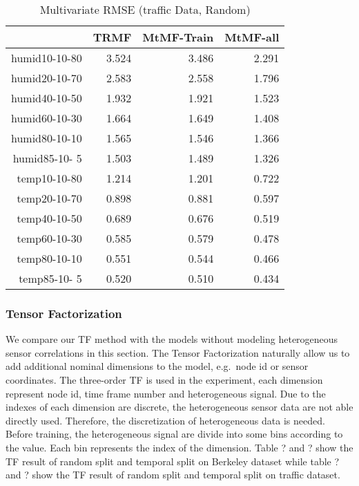 \begin{table}[htbp]
\caption{Multivariate RMSE (traffic Data, Random)}
\label{traffic}
\begin{tabular}{r | r r r}
	&TRMF	&MtMF-Train	&MtMF-all \\ \hline
humid10-10-80	&3.524 	&3.486 	&2.291\\  
humid20-10-70	&2.583 	&2.558 	&1.796\\
humid40-10-50	&1.932 	&1.921 	&1.523\\
humid60-10-30	&1.664 	&1.649 	&1.408\\
humid80-10-10	&1.565 	&1.546 	&1.366\\
humid85-10- 5	&1.503 	&1.489 	&1.326\\
 temp10-10-80	&1.214 	&1.201 	&0.722\\
 temp20-10-70	&0.898 	&0.881 	&0.597\\
 temp40-10-50	&0.689 	&0.676 	&0.519\\
 temp60-10-30	&0.585 	&0.579 	&0.478\\
 temp80-10-10	&0.551 	&0.544 	&0.466\\
 temp85-10- 5	&0.520 	&0.510 	&0.434\\
\end{tabular}
\end{table}

\subsubsection{Tensor Factorization} %
We compare our TF method with the models without modeling heterogeneous sensor correlations in this section.
The Tensor Factorization naturally allow us to add additional nominal dimensions to the model, e.g.\ node id or sensor coordinates.
The three-order TF is used in the experiment, each dimension represent node id, time frame number and heterogeneous signal.  
Due to the indexes of each dimension are discrete, the heterogeneous sensor data are not able directly used.
Therefore, the discretization of heterogeneous data is needed.
Before training, the heterogeneous signal are divide into some bins according to the value.
Each bin represents the index of the dimension.
Table ? and ? show the TF result of random split and temporal split on Berkeley dataset while table ? and ? show the TF result of random split and temporal split on traffic dataset.

